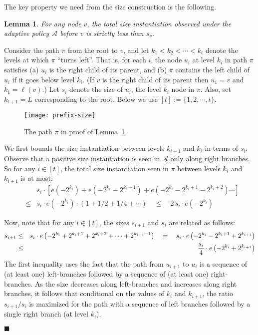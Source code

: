 \documentclass[11pt,letterpaper]{article}
\newtheorem{lemma}[theorem]{Lemma}
\numberwithin{algorithm}{section}
\newenvironment{proof}{

\noindent{\bf Proof:}}
{\hfill$\blacksquare$


}
\newcommand{\A}[0]{{\ensuremath{\mathcal{A}}}\xspace}
\newcommand{\q}[1]{e\left(#1\right)}
\begin{document}
The key property we need from the size construction is the following.
\begin{lemma}\label{lem:prefix-size}
For any node $v$, the total size instantiation observed under the adaptive policy \A before $v$ is strictly less than $s_v$.
\end{lemma}
\begin{proof}
Consider the path $\pi$ from the root to $v$, and let $k_1 < k_2<\cdots<k_t$ denote the levels at which $\pi$ ``turns left''. That is, for each $i$, the node $u_i$ at level $k_i$ in path $\pi$ satisfies (a) $u_i$ is the right child of its parent, and (b) $\pi$ contains the left child of $u_i$ if it goes below level $k_i$. (If $v$ is the right child of its parent then $u_1=v$ and $k_1=\ell(v)$.) Let $s_i$ denote the size of $u_i$, the level $k_i$ node in $\pi$. Also, set $k_{t+1}=L$ corresponding to the root. Below we use $[t]:=\{1,2,\cdots,t\}$.

\begin{figure}[ht]
  \begin{centering}
    \texttt{[image: prefix-size]}
    \caption{The path $\pi$ in proof of Lemma~\ref{lem:prefix-size}.    \label{fig:??} }
  \end{centering}
\end{figure}


We first bounds the size instantiation between levels $k_{i+1}$ and $k_{i}$ in terms of $s_i$.
Observe that a positive size instantiation is seen in \A only along right branches. So for any $i\in [t]$, the total size instantiation seen in $\pi$ between levels $k_i$ and $k_{i+1}$ is at most:
\begin{eqnarray}\label{eq:prefix-size1}
& & s_i\cdot \left[ \q{-2^{k_i}} + \q{-2^{k_i}-2^{k_i+1}} + \q{-2^{k_i}-2^{k_i+1} - 2^{k_i+2} }\cdots\right] \nonumber \\
 & \le &  s_i \cdot \q{-2^{k_i}} \cdot \left(1+1/2+1/4+\cdots \right) \quad \leq  \quad 2\,s_i\cdot \q{-2^{k_i}}
\end{eqnarray}

Now, note that for any $i\in[t]$, the sizes $s_{i+1}$ and $s_i$ are related as follows:
\begin{eqnarray}
s_{i+1} &\le & s_i \cdot \q{-2^{k_i} + 2^{k_i+1} + 2^{k_i+2} +\cdots +2^{k_{i+1}-1} }\quad =\quad s_i \cdot \q{-2^{k_i} - 2^{k_i+1} + 2^{k_{i+1}}} \notag \\
&\le &\frac{s_i}{4}\cdot \q{-2^{k_i}  + 2^{k_{i+1}}}  \label{eq:prefix-size2}
\end{eqnarray}
The first inequality uses the fact that the path from $u_{i+1}$ to $u_i$ is a sequence of (at least one) left-branches followed
by a sequence of (at least one) right-branches. As the size decreases along left-branches and increases along right branches, it follows that conditional on the values of $k_{i}$ and $k_{i+1}$, the  ratio $s_{i+1}/s_{i}$ is maximized for the path with a sequence of left branches followed by a single right branch (at level $k_i$).



\end{proof}
\end{document}
